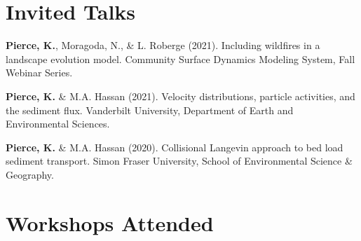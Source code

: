 \documentclass[11pt,letterpaper]{article}
\renewenvironment{itemize}{
	\begin{list}{}{
			\setlength{\leftmargin}{1.5em}
			\setlength{\rightmargin}{0em}  %
			\setlength{\itemsep}{0.25em}
			\setlength{\parskip}{0pt}
			\setlength{\parsep}{0.25em}
		}
	}{
	\end{list}
}
\renewenvironment{itemize}{
	\begin{list}{}{
			\setlength{\leftmargin}{1.5em}
			\setlength{\itemsep}{0.25em}
			\setlength{\parskip}{0pt}
			\setlength{\parsep}{0.25em}
		}
	}{
	\end{list}
}
\begin{document}
	\section*{Invited Talks}
	\begin{itemize}
		\item[] \textbf{Pierce, K.}, Moragoda, N., \& L. Roberge (2021). Including wildfires in a landscape evolution model. Community Surface Dynamics Modeling System, Fall Webinar Series.

		\item[] \textbf{Pierce, K.} \& M.A. Hassan (2021). Velocity distributions, particle activities, and the sediment flux. Vanderbilt University, Department of Earth and Environmental Sciences.
			
		\item[] \textbf{Pierce, K.} \& M.A. Hassan (2020). Collisional Langevin approach to bed load sediment transport. Simon Fraser University, School of Environmental Science \& Geography.
	\end{itemize}

\section*{Workshops Attended}
\end{document}
